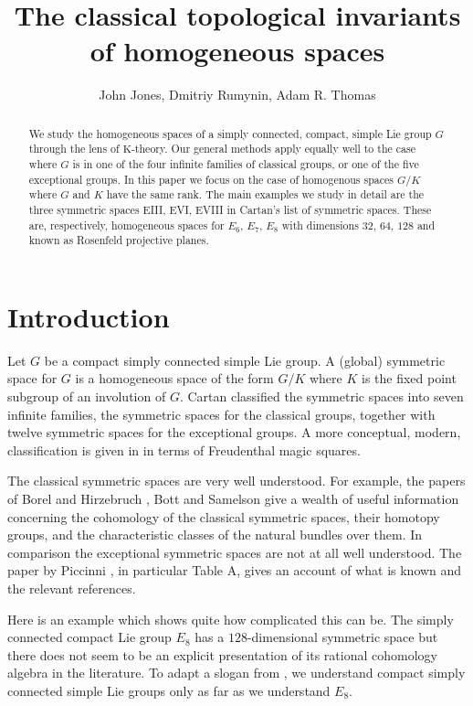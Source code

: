 \documentclass[twoside,a4paper,reqno,11pt]{amsart}
\title{The classical topological invariants of homogeneous spaces}
\author{John Jones, Dmitriy Rumynin, Adam R. Thomas}
\newcommand{\K}{\mathrm{K}}
\begin{document}
\begin{abstract} 
We study the homogeneous spaces of a simply connected, compact, simple Lie group $G$ through the lens of $\K$-theory. Our general methods apply equally well to the case where $G$ is in one of the four infinite families of classical groups, or one of the five exceptional groups. In this paper we focus on the case of homogenous spaces $G/K$ where $G$ and $K$ have the same rank. The main examples we study in detail are the three symmetric spaces EIII, EVI, EVIII in Cartan's list of symmetric spaces. These are, respectively, homogeneous spaces for $E_6$, $E_7$, $E_8$ with dimensions $32$, $64$, $128$ and known as Rosenfeld projective planes.
\end{abstract}


\maketitle






\section*{Introduction} \label{sec:intro}

Let $G$ be a compact simply connected simple Lie group.  A (global) symmetric space for $G$ is a homogeneous space of the form $G/K$ where $K$ is the fixed point subgroup of an involution of $G$.  Cartan classified the symmetric spaces into seven infinite families, the symmetric spaces for the classical groups, together with twelve symmetric spaces for the exceptional groups.  A more conceptual, modern, classification is given in \cite{MR2785763} in terms of Freudenthal magic squares.  

The classical  symmetric spaces are very well understood.  For example, the papers of Borel and Hirzebruch \cite{MR0102800,MR0110105,MR0120664}, Bott and Samelson \cite{MR87035,MR0060233} give a wealth of useful information concerning the cohomology of the classical symmetric spaces, their homotopy groups, and the characteristic classes of the natural bundles over them.  In comparison the exceptional symmetric spaces are not at all well understood.  The paper by Piccinni \cite{MR3751970}, in particular Table A, gives an account of what is known and the relevant references.

Here is an example which shows quite how complicated this can be.  The simply connected compact Lie group $E_8$ has a $128$-dimensional symmetric space but there does not seem to be an explicit presentation of its rational cohomology algebra in the literature. To adapt a slogan from \cite{MR3544263}, we understand compact simply connected simple Lie groups only as far as we understand $E_8$.
 
\end{document}
